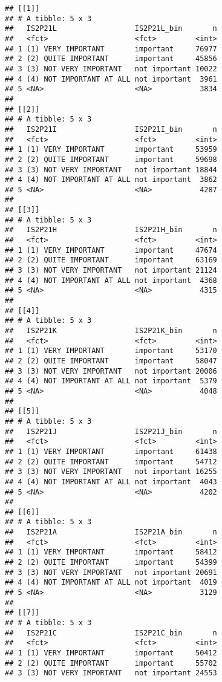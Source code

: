\documentclass[]{article}
\begin{document}
\begin{verbatim}
## [[1]]
## # A tibble: 5 x 3
##   IS2P21L                  IS2P21L_bin       n
##   <fct>                    <fct>         <int>
## 1 (1) VERY IMPORTANT       important     76977
## 2 (2) QUITE IMPORTANT      important     45856
## 3 (3) NOT VERY IMPORTANT   not important 10022
## 4 (4) NOT IMPORTANT AT ALL not important  3961
## 5 <NA>                     <NA>           3834
## 
## [[2]]
## # A tibble: 5 x 3
##   IS2P21I                  IS2P21I_bin       n
##   <fct>                    <fct>         <int>
## 1 (1) VERY IMPORTANT       important     53959
## 2 (2) QUITE IMPORTANT      important     59698
## 3 (3) NOT VERY IMPORTANT   not important 18844
## 4 (4) NOT IMPORTANT AT ALL not important  3862
## 5 <NA>                     <NA>           4287
## 
## [[3]]
## # A tibble: 5 x 3
##   IS2P21H                  IS2P21H_bin       n
##   <fct>                    <fct>         <int>
## 1 (1) VERY IMPORTANT       important     47674
## 2 (2) QUITE IMPORTANT      important     63169
## 3 (3) NOT VERY IMPORTANT   not important 21124
## 4 (4) NOT IMPORTANT AT ALL not important  4368
## 5 <NA>                     <NA>           4315
## 
## [[4]]
## # A tibble: 5 x 3
##   IS2P21K                  IS2P21K_bin       n
##   <fct>                    <fct>         <int>
## 1 (1) VERY IMPORTANT       important     53170
## 2 (2) QUITE IMPORTANT      important     58047
## 3 (3) NOT VERY IMPORTANT   not important 20006
## 4 (4) NOT IMPORTANT AT ALL not important  5379
## 5 <NA>                     <NA>           4048
## 
## [[5]]
## # A tibble: 5 x 3
##   IS2P21J                  IS2P21J_bin       n
##   <fct>                    <fct>         <int>
## 1 (1) VERY IMPORTANT       important     61438
## 2 (2) QUITE IMPORTANT      important     54712
## 3 (3) NOT VERY IMPORTANT   not important 16255
## 4 (4) NOT IMPORTANT AT ALL not important  4043
## 5 <NA>                     <NA>           4202
## 
## [[6]]
## # A tibble: 5 x 3
##   IS2P21A                  IS2P21A_bin       n
##   <fct>                    <fct>         <int>
## 1 (1) VERY IMPORTANT       important     58412
## 2 (2) QUITE IMPORTANT      important     54399
## 3 (3) NOT VERY IMPORTANT   not important 20691
## 4 (4) NOT IMPORTANT AT ALL not important  4019
## 5 <NA>                     <NA>           3129
## 
## [[7]]
## # A tibble: 5 x 3
##   IS2P21C                  IS2P21C_bin       n
##   <fct>                    <fct>         <int>
## 1 (1) VERY IMPORTANT       important     50412
## 2 (2) QUITE IMPORTANT      important     55702
## 3 (3) NOT VERY IMPORTANT   not important 24553

\end{verbatim}
\end{document}
